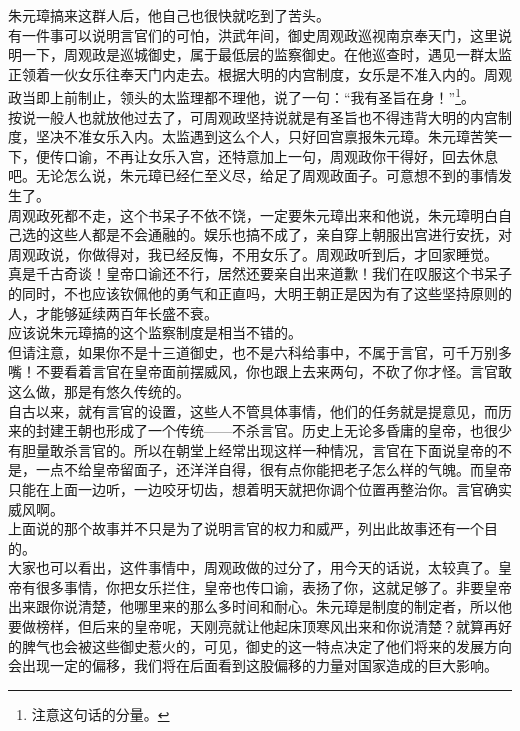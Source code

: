 \begin{multicols}{\theparacolNo}
朱元璋搞来这群人后，他自己也很快就吃到了苦头。\\

有一件事可以说明言官们的可怕，洪武年间，御史周观政巡视南京奉天门，这里说明一下，周观政是巡城御史，属于最低层的监察御史。在他巡查时，遇见一群太监正领着一伙女乐往奉天门内走去。根据大明的内宫制度，女乐是不准入内的。周观政当即上前制止，领头的太监理都不理他，说了一句：“我有圣旨在身！”\footnote{注意这句话的分量。}。\\

按说一般人也就放他过去了，可周观政坚持说就是有圣旨也不得违背大明的内宫制度，坚决不准女乐入内。太监遇到这么个人，只好回宫禀报朱元璋。朱元璋苦笑一下，便传口谕，不再让女乐入宫，还特意加上一句，周观政你干得好，回去休息吧。无论怎么说，朱元璋已经仁至义尽，给足了周观政面子。可意想不到的事情发生了。\\

周观政死都不走，这个书呆子不依不饶，一定要朱元璋出来和他说，朱元璋明白自己选的这些人都是不会通融的。娱乐也搞不成了，亲自穿上朝服出宫进行安抚，对周观政说，你做得对，我已经反悔，不用女乐了。周观政听到后，才回家睡觉。\\

真是千古奇谈！皇帝口谕还不行，居然还要亲自出来道歉！我们在叹服这个书呆子的同时，不也应该钦佩他的勇气和正直吗，大明王朝正是因为有了这些坚持原则的人，才能够延续两百年长盛不衰。\\

应该说朱元璋搞的这个监察制度是相当不错的。\\

但请注意，如果你不是十三道御史，也不是六科给事中，不属于言官，可千万别多嘴！不要看着言官在皇帝面前摆威风，你也跟上去来两句，不砍了你才怪。言官敢这么做，那是有悠久传统的。\\

自古以来，就有言官的设置，这些人不管具体事情，他们的任务就是提意见，而历来的封建王朝也形成了一个传统——不杀言官。历史上无论多昏庸的皇帝，也很少有胆量敢杀言官的。所以在朝堂上经常出现这样一种情况，言官在下面说皇帝的不是，一点不给皇帝留面子，还洋洋自得，很有点你能把老子怎么样的气魄。而皇帝只能在上面一边听，一边咬牙切齿，想着明天就把你调个位置再整治你。言官确实威风啊。\\

上面说的那个故事并不只是为了说明言官的权力和威严，列出此故事还有一个目的。\\

大家也可以看出，这件事情中，周观政做的过分了，用今天的话说，太较真了。皇帝有很多事情，你把女乐拦住，皇帝也传口谕，表扬了你，这就足够了。非要皇帝出来跟你说清楚，他哪里来的那么多时间和耐心。朱元璋是制度的制定者，所以他要做榜样，但后来的皇帝呢，天刚亮就让他起床顶寒风出来和你说清楚？就算再好的脾气也会被这些御史惹火的，可见，御史的这一特点决定了他们将来的发展方向会出现一定的偏移，我们将在后面看到这股偏移的力量对国家造成的巨大影响。\\


\end{multicols}
